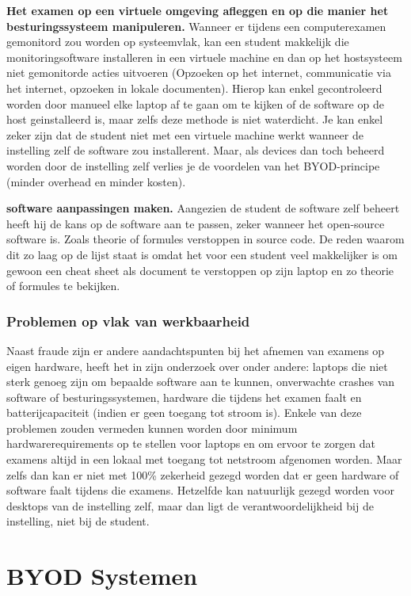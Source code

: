 \textbf{Het examen op een virtuele omgeving afleggen en op die manier het besturingssysteem manipuleren.} Wanneer er tijdens een computerexamen gemonitord zou worden op systeemvlak, kan een student makkelijk die monitoringsoftware installeren in een virtuele machine en dan op het hostsysteem niet gemonitorde acties uitvoeren (Opzoeken op het internet, communicatie via het internet, opzoeken in lokale documenten). Hierop kan enkel gecontroleerd worden door manueel elke laptop af te gaan om te kijken of de software op de host geinstalleerd is, maar zelfs deze methode is niet waterdicht. Je kan enkel zeker zijn dat de student niet met een virtuele machine werkt wanneer de instelling zelf de software zou installerent. Maar, als devices dan toch beheerd worden door de instelling zelf verlies je de voordelen van het BYOD-principe (minder overhead en minder kosten).

\textbf{software aanpassingen maken.} Aangezien de student de software zelf beheert heeft hij de kans op de software aan te passen, zeker wanneer het open-source software is. Zoals theorie of formules verstoppen in source code. De reden waarom dit zo laag op de lijst staat is omdat het voor een student veel makkelijker is om gewoon een cheat sheet als document te verstoppen op zijn laptop en zo theorie of formules te bekijken. 

\subsubsection{Problemen op vlak van werkbaarheid}
Naast fraude zijn er andere aandachtspunten bij het afnemen van examens op eigen hardware, \textcite{Hillier2015} heeft het in zijn onderzoek over onder andere: laptops die niet sterk genoeg zijn om bepaalde software aan te kunnen, onverwachte crashes van software of besturingssystemen, hardware die tijdens het examen faalt en batterijcapaciteit (indien er geen toegang tot stroom is). Enkele van deze problemen zouden vermeden kunnen worden door minimum hardwarerequirements op te stellen voor laptops en om ervoor te zorgen dat examens altijd in een lokaal met toegang tot netstroom afgenomen worden. Maar zelfs dan kan er niet met 100\% zekerheid gezegd worden dat er geen hardware of software faalt tijdens die examens. Hetzelfde kan natuurlijk gezegd worden voor desktops van de instelling zelf, maar dan ligt de verantwoordelijkheid bij de instelling, niet bij de student. 


    
\section{BYOD Systemen}

